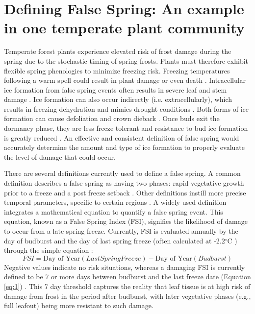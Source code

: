 \documentclass{article}\usepackage[]{graphicx}\usepackage[]{color}
\begin{document}
\section{Defining False Spring: An example in one temperate plant community}
Temperate forest plants experience elevated risk of frost damage during the spring due to the stochastic timing of spring frosts. 
Plants must therefore exhibit flexible spring phenologies to minimize freezing risk. Freezing temperatures following a warm spell could result in plant damage or even death \citep{Ludlum1968, Mock2007}. Intracellular ice formation from false spring events often results in severe leaf and stem damage \citep{Burke1976, Sakai1987}. Ice formation can also occur indirectly (i.e. extracellularly), which results in freezing dehydration and mimics drought conditions \citep{Pearce2001, Beck2004, Hofmann2015}. Both forms of ice formation can cause defoliation and crown dieback \citep{Gu2008}. Once buds exit the dormancy phase, they are less freeze tolerant and resistance to bud ice formation is greatly reduced \citep{Taschler2004, Lenz2013, Vitasse2014a}. An effective and consistent definition of false spring would accurately determine the amount and type of ice formation to properly evaluate the level of damage that could occur.

There are several definitions currently used to define a false spring. A common definition describes a false spring as having two phases: rapid vegetative growth prior to a freeze and a post freeze setback \citep{Gu2008}. Other definitions instill more precise temporal parameters, specific to certain regions \citep[e.g., in][false spring for the Midwestern United States is defined as a warmer than average March, a freezing April, and enough growing degree days between budburst and the last freeze date]{Augspurger2013}. A widely used definition integrates a mathematical equation to quantify a false spring event. This equation, known as a False Spring Index (FSI), signifies the likelihood of damage to occur from a late spring freeze. Currently, FSI is evaluated annually by the day of budburst and the day of last spring freeze (often calculated at -2.2$^{\circ}$C \citep{Schwartz1993}) through the simple equation \citep{Marino2011}:
\begin{equation} \label{eq:1}
FSI = \text{Day of Year} (Last Spring Freeze) - \text{Day of Year} (Budburst)
\end{equation}
Negative values indicate no risk situations, whereas a damaging FSI is currently defined to be 7 or more days between budburst and the last freeze date (Equation \ref{eq:1}) \citep{Peterson2014}. This 7 day threshold captures the reality that leaf tissue is at high risk of damage from frost in the period after budburst, with later vegetative phases (e.g., full leafout) being more resistant to such damage.%
\end{document}
